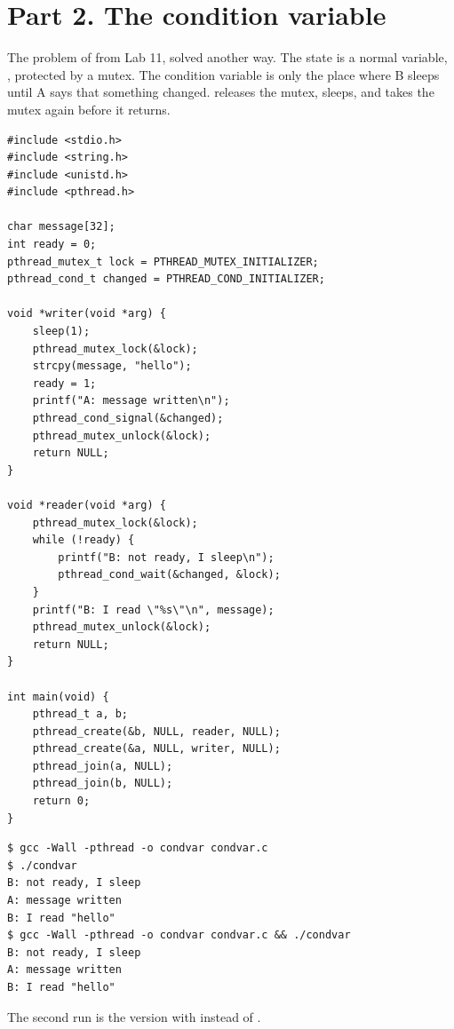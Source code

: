 \documentclass[11pt,a4paper]{article}
\begin{document}
\section{Part 2. The condition variable}

The problem of  from Lab 11, solved another way. The state is a normal variable,
, protected by a mutex. The condition variable is only the place where B sleeps
until A says that something changed.  releases the mutex, sleeps, and
takes the mutex again before it returns.

\begin{lstlisting}[style=ccode,caption={condvar.c}]
#include <stdio.h>
#include <string.h>
#include <unistd.h>
#include <pthread.h>

char message[32];
int ready = 0;
pthread_mutex_t lock = PTHREAD_MUTEX_INITIALIZER;
pthread_cond_t changed = PTHREAD_COND_INITIALIZER;

void *writer(void *arg) {
    sleep(1);
    pthread_mutex_lock(&lock);
    strcpy(message, "hello");
    ready = 1;
    printf("A: message written\n");
    pthread_cond_signal(&changed);
    pthread_mutex_unlock(&lock);
    return NULL;
}

void *reader(void *arg) {
    pthread_mutex_lock(&lock);
    while (!ready) {
        printf("B: not ready, I sleep\n");
        pthread_cond_wait(&changed, &lock);
    }
    printf("B: I read \"%s\"\n", message);
    pthread_mutex_unlock(&lock);
    return NULL;
}

int main(void) {
    pthread_t a, b;
    pthread_create(&b, NULL, reader, NULL);
    pthread_create(&a, NULL, writer, NULL);
    pthread_join(a, NULL);
    pthread_join(b, NULL);
    return 0;
}
\end{lstlisting}

\begin{lstlisting}[caption={condvar, with while and with if}]
$ gcc -Wall -pthread -o condvar condvar.c
$ ./condvar
B: not ready, I sleep
A: message written
B: I read "hello"
$ gcc -Wall -pthread -o condvar condvar.c && ./condvar
B: not ready, I sleep
A: message written
B: I read "hello"
\end{lstlisting}

The second run is the version with  instead of .
\end{document}
